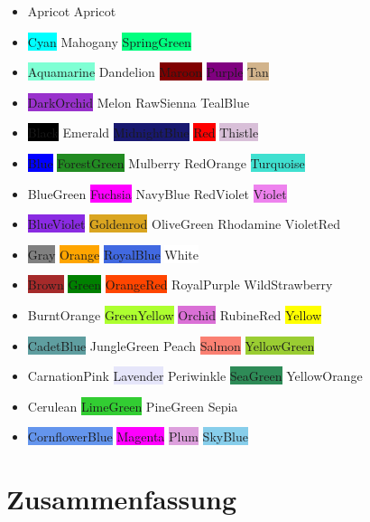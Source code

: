 \begin{itemize}
	\item[] \colorbox{Apricot}{Apricot} \textcolor{Apricot}{Apricot}
	\item[] \colorbox{Cyan}{Cyan}  \colorbox{Mahogany}{Mahogany} 	\colorbox{SpringGreen}{SpringGreen}
	\item[] \colorbox{Aquamarine}{Aquamarine}	\colorbox{Dandelion}{Dandelion}	\colorbox{Maroon}{Maroon}	\colorbox{Purple}{Purple}	\colorbox{Tan}{Tan}
	\item[] \colorbox{DarkOrchid}{DarkOrchid}	\colorbox{Melon}{Melon}	\colorbox{RawSienna}{RawSienna}		\colorbox{TealBlue}{TealBlue}
	\item[] \colorbox{Black}{Black}	 \colorbox{Emerald}{Emerald}		\colorbox{MidnightBlue}{MidnightBlue}     \colorbox{Red}{Red}	\colorbox{Thistle}{Thistle}
	\item[] \colorbox{Blue}{Blue}	   \colorbox{ForestGreen}{ForestGreen}	\colorbox{Mulberry}{Mulberry}		\colorbox{RedOrange}{RedOrange}		\colorbox{Turquoise}{Turquoise}
	\item[] \colorbox{BlueGreen}{BlueGreen}	\colorbox{Fuchsia}{Fuchsia}		\colorbox{NavyBlue}{NavyBlue}	 \colorbox{RedViolet}{RedViolet}		\colorbox{Violet}{Violet}
	\item[] \colorbox{BlueViolet}{BlueViolet}	\colorbox{Goldenrod}{Goldenrod}	\colorbox{OliveGreen}{OliveGreen}		\colorbox{Rhodamine}{Rhodamine}	  	\colorbox{VioletRed}{VioletRed}
	\item[] \colorbox{Gray}{Gray}	\colorbox{Orange}{Orange}	\colorbox{RoyalBlue}{RoyalBlue}	\colorbox{White}{White}
	\item[] \colorbox{Brown}{Brown}	\colorbox{Green}{Green}		\colorbox{OrangeRed}{OrangeRed}		\colorbox{RoyalPurple}{RoyalPurple}		\colorbox{WildStrawberry}{WildStrawberry}
	\item[] \colorbox{BurntOrange}{BurntOrange}	\colorbox{GreenYellow}{GreenYellow}	\colorbox{Orchid}{Orchid}	 \colorbox{RubineRed}{RubineRed}		\colorbox{Yellow}{Yellow}
	\item[] \colorbox{CadetBlue}{CadetBlue}	\colorbox{JungleGreen}{JungleGreen}	\colorbox{Peach}{Peach}		\colorbox{Salmon}{Salmon}	\colorbox{YellowGreen}{YellowGreen}
	\item[] \colorbox{CarnationPink}{CarnationPink}	\colorbox{Lavender}{Lavender} \colorbox{Periwinkle}{Periwinkle}	\colorbox{SeaGreen}{SeaGreen}         \colorbox{YellowOrange}{YellowOrange}
	\item[] \colorbox{Cerulean}{Cerulean}	\colorbox{LimeGreen}{LimeGreen}	\colorbox{PineGreen}{PineGreen}	\colorbox{Sepia}{Sepia}
	\item[] \colorbox{CornflowerBlue}{CornflowerBlue}	\colorbox{Magenta}{Magenta}	\colorbox{Plum}{Plum}	 \colorbox{SkyBlue}{SkyBlue}
\end{itemize} 


\section{Zusammenfassung}\label{sec:zusammenfassung}

